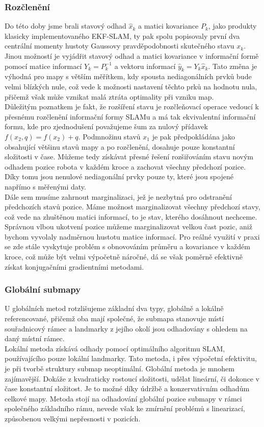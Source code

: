 \documentclass[11pt]{article}
\begin{document}
\subsubsection{Rozčlenění}
Do této doby jsme brali stavový odhad $\hat{x}_k$ a matici kovariance $P_k$, jako produkty klasicky implementovaného EKF-SLAM, ty pak spolu popisovaly první dva centrální momenty hustoty Gaussovy pravděpodobnosti skutečného stavu $x_k$. Jinou možností je vyjádřit stavový odhad a matici kovariance v informační formě pomocí matice informací $Y_k=P^{-1}_k$ a vektoru informací $\hat{y}_k=Y_k\hat{x}_k$. Tato změna je výhodná pro mapy s větším měřítkem, kdy spousta nediagonálních prvků bude velmi blízkých nule, což vede k možnosti nastavení těchto prků na hodnotu nula, přičemž však může vznikat malá ztráta optimality při vzniku map. \\
\indent Důležitým poznatkem je fakt, že rozšíření stavu je rozčleňovací operace vedoucí k přesnému rozčlenění informační formy SLAMu a má tak ekvivalentní informační formu, kde pro zjednodušení považujeme šum za nulový přídavek $f(x_2,q)=f(x_2)+q$. Podmnožinu stavů $x_1$ je pak předpokládána jako obsahující většinu stavů mapy a po rozčlenění, dosahuje pouze konstantní složitosti v čase. Můžeme tedy získávat přesné řešení rozšiřováním stavu novým odhadem pozice robota v každém kroce a zachovat všechny předchozí pozice. Díky tomu jsou nenulové nediagonální prvky pouze ty, které jsou spojené napřímo s měřenými daty.  \\
\indent Dále sem musíme zahrnout marginalizaci, jež je nezbytná pro odstranění předchozích stavů pozice. Máme možnost marginalizovat všechny předchozí stavy, což vede na zhuštěnou matici informací, to je stav, kterého dosáhnout nechceme. Správnou vlbou ukotvení pozice můžeme marginalizovat velkou čast pozic, aniž bychom vyvolaly nadměrnou hustotu matice informací. Pro reálné využití v praxi se zde stále vyskytuje problém s obnovováním průměru a kovariance v každém kroce, což může být velmi výpočetně náročné, dá se však poměrně efektivně získat konjugačními gradientními metodami. 

\subsubsection{Globální submapy}
U globálních metod rotzlišujeme základní dva typy, globálně a lokálně referencované, přičemž oba mají společné, že submapa stanovuje místí souřadnicový rámec a landmarky z jejího okolí jsou odhadovány s ohledem na daný místní rámec. \\
\indent Lokální metoda získává odhady pomocí optimálního algoritmu SLAM, používajícího pouze lokální landmarky. Tato metoda, i přes výpočetní efektivitu, je při tvorbě struktury submap neoptimální. Globální metoda je mnohem zajímavější. Dokáže z kvadraticky rostoucí složitosti, udělat lineární, či dokonce v čase konstantní složitost. Je to možné díky údržbě a konzervativním odhadům celkové mapy. Metoda stojí na odhadování globální pozice submapy v rámci společného základního rámu, nevede však ke zmírnění problémů s linearizací, způsobenou velkými nepřesnosti v pozicích.
\end{document}
